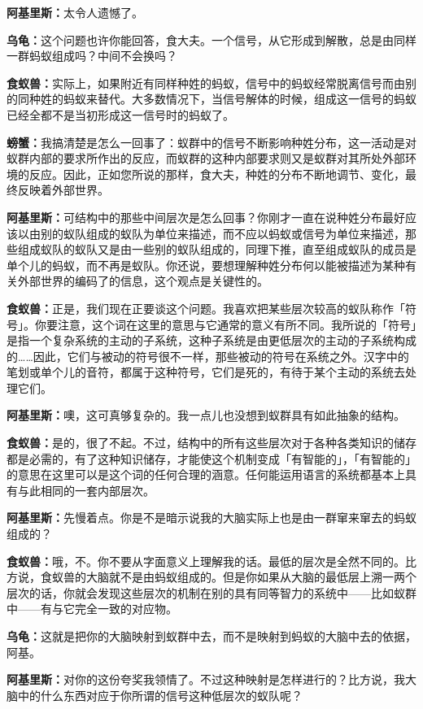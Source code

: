 \documentclass[
  12pt,
  twoside,
  openright,
  oldfontcommands,
]{memoir}
\newcommand{\dialogname}[1]{{\heifamily\bfseries #1}}
\begin{document}
\dialogname{阿基里斯：}太令人遗憾了。

\dialogname{乌龟：}这个问题也许你能回答，食大夫。一个信号，从它形成到解散，总是由同样一群蚂蚁组成吗？中间不会换吗？

\dialogname{食蚁兽：}实际上，如果附近有同样种姓的蚂蚁，信号中的蚂蚁经常脱离信号而由别的同种姓的蚂蚁来替代。大多数情况下，当信号解体的时候，组成这一信号的蚂蚁已经全都不是当初形成这一信号时的蚂蚁了。

\dialogname{螃蟹：}我搞清楚是怎么一回事了：蚁群中的信号不断影响种姓分布，这一活动是对蚁群内部的要求所作出的反应，而蚁群的这种内部要求则又是蚁群对其所处外部环境的反应。因此，正如您所说的那样，食大夫，种姓的分布不断地调节、变化，最终反映着外部世界。

\dialogname{阿基里斯：}可结构中的那些中间层次是怎么回事？你刚才一直在说种姓分布最好应该以由别的蚁队组成的蚁队为单位来描述，而不应以蚂蚁或信号为单位来描述，那些组成蚁队的蚁队又是由一些别的蚁队组成的，同理下推，直至组成蚁队的成员是单个儿的蚂蚁，而不再是蚁队。你还说，要想理解种姓分布何以能被描述为某种有关外部世界的编码了的信息，这个观点是关键性的。

\dialogname{食蚁兽：}正是，我们现在正要谈这个问题。我喜欢把某些层次较高的蚁队称作「符号」。你要注意，这个词在这里的意思与它通常的意义有所不同。我所说的「符号」是指一个复杂系统的主动的子系统，这种子系统是由更低层次的主动的子系统构成的\ldots\ldots 因此，它们与被动的符号很不一样，那些被动的符号在系统之外。汉字中的笔划或单个儿的音符，都属于这种符号，它们是死的，有待于某个主动的系统去处理它们。

\dialogname{阿基里斯：}噢，这可真够复杂的。我一点儿也没想到蚁群具有如此抽象的结构。

\dialogname{食蚁兽：}是的，很了不起。不过，结构中的所有这些层次对于各种各类知识的储存都是必需的，有了这种知识储存，才能使这个机制变成「有智能的」，「有智能的」的意思在这里可以是这个词的任何合理的涵意。任何能运用语言的系统都基本上具有与此相同的一套内部层次。

\dialogname{阿基里斯：}先慢着点。你是不是暗示说我的大脑实际上也是由一群窜来窜去的蚂蚁组成的？

\dialogname{食蚁兽：}哦，不。你不要从字面意义上理解我的话。最低的层次是全然不同的。比方说，食蚁兽的大脑就不是由蚂蚁组成的。但是你如果从大脑的最低层上溯一两个层次的话，你就会发现这些层次的机制在别的具有同等智力的系统中------比如蚁群中------有与它完全一致的对应物。

\dialogname{乌龟：}这就是把你的大脑映射到蚁群中去，而不是映射到蚂蚁的大脑中去的依据，阿基。

\dialogname{阿基里斯：}对你的这份夸奖我领情了。不过这种映射是怎样进行的？比方说，我大脑中的什么东西对应于你所谓的信号这种低层次的蚁队呢？
\end{document}
